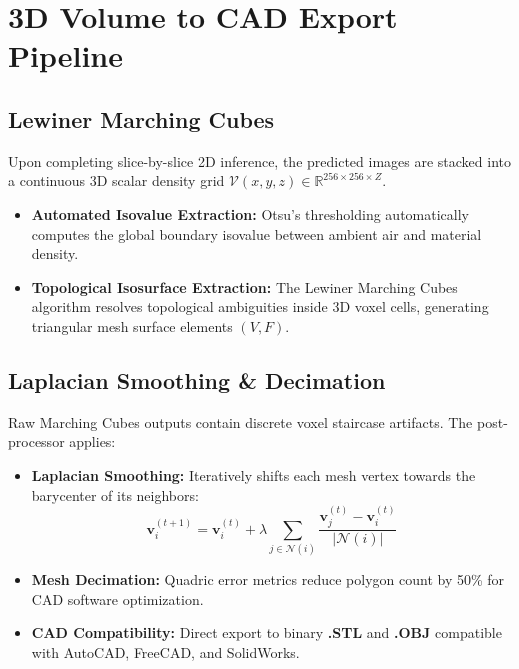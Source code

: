 \documentclass[10pt,a4paper]{article}
\begin{document}
\section{3D Volume to CAD Export Pipeline}

\begin{minipage}[t]{0.48\textwidth}
\subsection{Lewiner Marching Cubes}
Upon completing slice-by-slice 2D inference, the predicted images are stacked into a continuous 3D scalar density grid $\mathcal{V}(x, y, z) \in \mathbb{R}^{256 \times 256 \times Z}$.
\begin{itemize}[leftmargin=*,noitemsep]
    \item \textbf{Automated Isovalue Extraction:} Otsu's thresholding automatically computes the global boundary isovalue between ambient air and material density.
    \item \textbf{Topological Isosurface Extraction:} The Lewiner Marching Cubes algorithm resolves topological ambiguities inside 3D voxel cells, generating triangular mesh surface elements $(V, F)$.
\end{itemize}
\end{minipage}
\hfill
\begin{minipage}[t]{0.48\textwidth}
\subsection{Laplacian Smoothing \& Decimation}
Raw Marching Cubes outputs contain discrete voxel staircase artifacts. The post-processor applies:
\begin{itemize}[leftmargin=*,noitemsep]
    \item \textbf{Laplacian Smoothing:} Iteratively shifts each mesh vertex towards the barycenter of its neighbors:
    \begin{equation}
        \mathbf{v}_i^{(t+1)} = \mathbf{v}_i^{(t)} + \lambda \sum_{j \in \mathcal{N}(i)} \frac{\mathbf{v}_j^{(t)} - \mathbf{v}_i^{(t)}}{|\mathcal{N}(i)|}
    \end{equation}
    \item \textbf{Mesh Decimation:} Quadric error metrics reduce polygon count by 50\% for CAD software optimization.
    \item \textbf{CAD Compatibility:} Direct export to binary \textbf{.STL} and \textbf{.OBJ} compatible with AutoCAD, FreeCAD, and SolidWorks.
\end{itemize}
\end{minipage}
\end{document}
